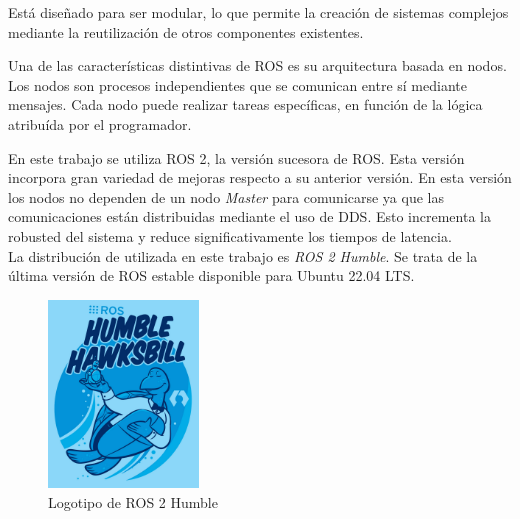 Está diseñado para ser modular, lo que permite la creación de sistemas complejos mediante la reutilización de otros componentes existentes.

Una de las características distintivas de ROS es su arquitectura basada en nodos. Los nodos son procesos independientes 
que se comunican entre sí mediante mensajes. Cada nodo puede realizar tareas específicas, en función de la lógica atribuída por el programador.

En este trabajo se utiliza ROS 2, la versión sucesora de ROS. Esta versión incorpora gran variedad de mejoras respecto a su anterior versión. En esta versión 
los nodos no dependen de un nodo \textit{Master} para comunicarse ya que las comunicaciones están distribuidas mediante el uso de \ac{DDS}. Esto 
incrementa la robusted del sistema y reduce significativamente los tiempos de latencia. \\
La distribución de utilizada en este trabajo es \textit{ROS 2 Humble}. Se trata de la última versión de ROS estable disponible para Ubuntu 22.04 LTS.
\begin{figure} [h!]
  \begin{center}
    \includegraphics[width=4cm]{figs/ros2logo.jpeg}
  \end{center}
  \caption{Logotipo de ROS 2 Humble}
  \label{fig:ros2logo}
\end{figure}\ 

